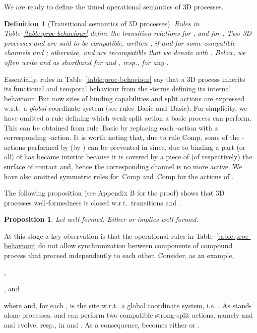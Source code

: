 \documentclass[11pt]{article}
\def\name#1{\mbox{\sc #1}}
\newtheorem{definition}{Definition}
\newtheorem{proposition}{Proposition}
\begin{document}
We are ready to define the timed operational semantics of 3D processes.

\begin{definition}[Transitional semantics of 3D processes]
\label{def:tbehprocesses}
Rules in Table~\ref{table:proc-behaviour} define the transition relations  for , and  for  .
Two 3D processes  and  are said to be {\em compatible}, written , if   and  for some compatible channels
 and ;
otherwise,  and  are {\em incompatible} that we denote with .
Below, we often write  and  as shorthand for
 and , resp., for any .
\end{definition}

Essentially, rules in Table~\ref{table:proc-behaviour} say that a 3D process inherits its functional and temporal behaviour from the -terms defining its internal behaviour. But now sites of binding capabilities and split actions are expressed w.r.t.\ a {\em global} coordinate system (see rules~\name{Basic} and~\name{Basic}). For simplicity, we have omitted a rule defining which weak-split action a basic process can perform. This can be obtained from rule~\name{Basic} by replacing each -action with a corresponding -action. It is worth noting that, due to rule \name{Comp}, some of the -actions performed by  (by ) can be prevented in  since, due to binding a part (or all) of  has became interior because it is covered by a piece of  (of  respectively) the surface of contact  and, hence the corresponding channel is no more active. We have also omitted symmetric rules for~\name{Comp} and~\name{Comp} for the actions of .


The following proposition (see Appendix B for the proof) shows that 3D processes
well-formedness is closed w.r.t.\ transitions  and .

\begin{proposition}\label{prop:closure-3d}
Let  well-formed. Either  or  implies 
well-formed.
\end{proposition}


\begin{table}[tbp]

\caption{Functional and temporal behaviour of -terms}
\label{table:proc-behaviour}
\end{table}

At this stage a key observation is that the operational rules in Table~\ref{table:proc-behaviour} do
not allow synchronization between components of compound process that proceed independently to each
other. Consider, as an example,
\begin{description}
\item ,
\item , and  
\end{description}
where  and, for each ,  is the site  w.r.t.\ a global coordinate system, i.e. . As stand-alone processes,  and  can perform two compatible strong-split actions, namely  and  and evolve, resp., in  and . As a consequence,  becomes either  or .
\end{document}

